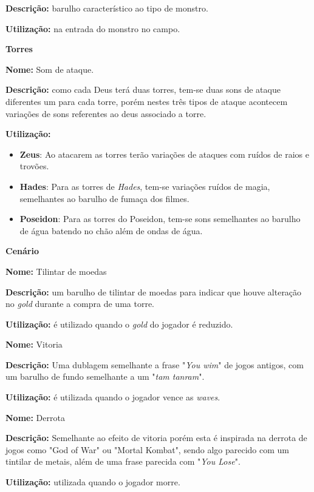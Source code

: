 \documentclass[11pt]{article} %
\begin{document}
\textbf{Descrição:} barulho característico ao tipo de monstro.

\textbf{Utilização:} na entrada do monstro no campo.


{\LARGE \textbf{Torres}}

\item
\textbf{Nome:} Som de ataque.

\textbf{Descrição:} como cada Deus terá duas torres, tem-se duas sons de ataque diferentes um para cada torre, porém nestes três tipos de ataque acontecem variações de sons referentes ao deus associado a torre.

\textbf{Utilização:} 
\begin{itemize}
\item \textbf{Zeus}: Ao atacarem as torres terão variações de ataques com ruídos de raios e trovões.
\item \textbf{Hades}: Para as torres de \textit{Hades}, tem-se variações ruídos de magia, semelhantes ao barulho de fumaça dos filmes.
\item \textbf{Poseidon}: Para as torres do Poseidon, tem-se sons semelhantes ao barulho de água batendo no chão além de ondas de água.
\end{itemize}

{\LARGE \textbf{Cenário}}

\item
\textbf{Nome:} Tilintar de moedas

\textbf{Descrição:} um barulho de tilintar de moedas para indicar que houve alteração no \textit{gold} durante a compra de uma torre. 

\textbf{Utilização:} é utilizado quando o \textit{gold} do jogador é reduzido.

\item
\textbf{Nome:} Vitoria

\textbf{Descrição:} Uma dublagem semelhante a frase "\textit{You wim}" de jogos antigos, com um barulho de fundo semelhante a um "\textit{tam tanram}".

\textbf{Utilização:} é utilizada quando o jogador vence as \textit{waves}.

\item
\textbf{Nome:} Derrota

\textbf{Descrição:} Semelhante ao efeito de vitoria porém esta é inspirada na derrota de jogos como "God of War" ou "Mortal Kombat", sendo algo parecido com um tintilar de metais, além de uma frase parecida com "\textit{You Lose}".

\textbf{Utilização:} utilizada quando o jogador morre.
\end{document}
